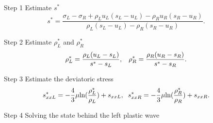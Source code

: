 \documentclass{article}
\theoremstyle{plain}\newtheorem{definition}{\sc{Definition}}
\theoremstyle{defination}\newtheorem{example}{Example}[section]
\numberwithin{equation}{section}
\numberwithin{table}{section}
\begin{document}
Step 1  Estimate $s^*$
\begin{equation*}
  s^* = \frac{\sigma_L-\sigma_R+\rho_L u_L(s_L-u_L)-\rho_R u_R(s_R-u_R)}{\rho_L(s_L-u_L)-\rho_R(s_R-u_R)}.
\end{equation*}

Step 2  Estimate $\rho_L^*$ and $\rho_R^*$
\begin{equation*}
  \rho_L^* = \frac{\rho_L(u_L-s_L)}{s^*-s_L}, \hspace{0.3cm}  \rho_R^* = \frac{\rho_R(u_R-s_R)}{s^*-s_R}.
\end{equation*}

Step 3   Estimate the deviatoric stress
\begin{equation*}
  s_{xxL}^*=-\frac{4}{3}\mu\text{ln}(\frac{\rho_L^*}{\rho_L})+s_{xxL},\hspace{0.2cm}  s_{xxR}^*=-\frac{4}{3}\mu\text{ln}(\frac{\rho_R^*}{\rho_R})+s_{xxR}.
\end{equation*}

Step 4 Solving the state behind the left  plastic wave
\end{document}
